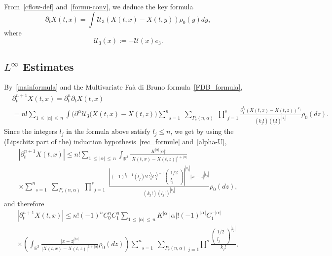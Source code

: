\documentclass[10pt]{amsart}
\theoremstyle{definition}\newtheorem{defi}[theo]{Definition}\newtheorem{rema}[theo]{Remark}\newtheorem{exam}[theo]{Example}\newtheorem{exem}[theo]{Example}\newtheorem{nota}[theo]{Notation}
\newcommand{\R}{\mathbb{R}}
\newcommand{\clU}{\mathcal{U}}
\renewcommand{\leq}{\leqslant}
\begin{document}
From~\eqref{cflow-def} and~\eqref{formu-conv}, we deduce the key formula
\begin{equation}\label{mainformula}
\partial_t X(t,x)=\int \clU_3(X(t,x)-X(t,y)) \rho_0(y) dy,
\end{equation}
where
\[
\clU_3(x):=- \clU(x)e_3.
\]


\subsection{\texorpdfstring{$L^\infty$}{L infty} Estimates}

By~\eqref{mainformula} and the Multivariate Faà di Bruno formula~\eqref{FDB_formula},
\begin{align*}
&\partial_t^{n+1} X(t,x)= \partial_t^n \partial_t X(t,x)\\
&=n! \underset{1\,\leq\,|\alpha|\,\leq\,n}{\sum} \int \big(\partial^\alpha \clU_3(X(t,x)-X(t,z)\big)\underset{s=1}{\overset{n}{\sum}}\;\underset{P_s(n,\alpha)}{\sum}\;\underset{j=1}{\overset{s}{\prod}}\frac{\partial_t^{l_j} (X(t,x)-X(t,z))^{k_j}}{\left(k_j!\right) \left(l_j!\right)^{|k_j|}}\rho_0(dz).
\end{align*}
Since the integers $l_j$ in the formula above satisfy $l_j\leq n$, we get by using the (Lipschitz part of the) induction hypothesis~\eqref{rec_formule} and~\eqref{alpha-U},
\begin{multline*}
\left|\partial_t^{n+1} X(t,x)\right| \leq n! \underset{1\,\leq\,|\alpha|\,\leq\,n}{\sum} \int_{\R^3} \frac{K^{|\alpha|}|\alpha|!}{|X(t,x)-X(t,z)|^{1+|\alpha|}}\\
\times \underset{s=1}{\overset{n}{\sum}}\;\underset{P_s(n,\alpha)}{\sum}\;\underset{j=1}{\overset{s}{\prod}}\;\frac{\left| (-1)^{l_j-1}\left(l_j\right)!C_0^{l_j}C_1^{l_j-1}
\begin{pmatrix}
1/2\\ l_j
\end{pmatrix}\right|^{|k_j|} |x-z|^{|k_j|}}{\left(k_j!\right) \left(l_j!\right)^{|k_j|}}\rho_0(dz),
\end{multline*}
and therefore
\begin{multline*}
\left|\partial_t^{n+1} X(t,x)\right|
\leq n!(-1)^n C_0^n C_1^n \underset{1\,\leq\,|\alpha|\,\leq\,n}{\sum} K^{|\alpha|}|\alpha|!(-1)^{|\alpha|}C_1^{-|\alpha|}\\
\times \left(\int_{\R^3}
\frac{|x-z|^{|\alpha|}}{|X(t,x)-X(t,z)|^{1+|\alpha|}}\rho_0(dz)\right) \underset{s=1}{\overset{n}{\sum}}\;\underset{P_s(n,\alpha)}{\sum}\underset{j=1}\;{\overset{s}{\prod}} \frac{
\begin{pmatrix}1/2\\ l_j
\end{pmatrix}^{|k_j|}}{k_j!},
\end{multline*}
\end{document}
